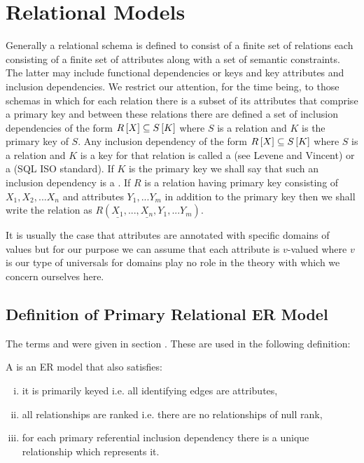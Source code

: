 \section{Relational Models}
Generally a relational schema is defined to consist of a finite set of relations each consisting of a
finite set of attributes along with a set of semantic constraints. The latter may include functional dependencies or keys and key attributes and inclusion dependencies.  We restrict our attention, for the time being, to those schemas in which for each relation there is a subset of its attributes that comprise a primary key and between these relations there are defined  a set of inclusion dependencies of the 
form $R\left[X\right]\subseteq S\left[K\right]$ where $S$ is a relation and $K$ is the primary key of $S$.
Any inclusion dependency of the form $R\left[X\right]\subseteq S\left[K\right]$ where $S$ is a relation and $K$ is a key for that relation is called a  (see Levene and Vincent) or a  (SQL ISO standard).
If $K$ is the primary key we shall say that such an inclusion dependency is a . If $R$ is a relation having primary key consisting
of $X_1,X_2,...X_n$ and attributes $Y_1,...Y_m$ in addition to the primary key 
 then we shall write the relation as $R(\underline{X_1},...,\underline{X_n},Y_1,...Y_m)$.

It is usually the case that attributes are annotated with specific domains of values but for our purpose we can assume that each attribute is $v$-valued where $v$ is our type of universals for domains play no role in the theory with which we concern ourselves here.
\subsection{Definition of Primary Relational ER Model}
The terms  and 
 were given in 
section . These are used in the following definition:
\begin{definition}
\noindent 
A  is an  ER model that also satisfies:
\begin{enumerate}[(i)]
\item
it is primarily keyed i.e. all identifying edges are attributes, 
\item
all relationships are ranked i.e. there are no relationships of null rank,
\item 
for each primary referential inclusion dependency there is a unique relationship which represents it.
\end{enumerate} 
\end{definition}

